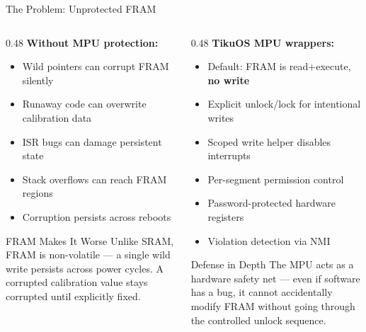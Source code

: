 \documentclass[aspectratio=169, 10pt]{beamer}
\begin{document}
\begin{frame}{The Problem: Unprotected FRAM}
\begin{columns}[T]
\begin{column}{0.48\textwidth}
\textbf{Without MPU protection:}
\begin{itemize}
  \item Wild pointers can corrupt FRAM silently
  \item Runaway code can overwrite calibration data
  \item ISR bugs can damage persistent state
  \item Stack overflows can reach FRAM regions
  \item Corruption persists across reboots
\end{itemize}

\vspace{0.5em}
\begin{alertblock}{FRAM Makes It Worse}
Unlike SRAM, FRAM is non-volatile --- a single wild write
persists across power cycles. A corrupted calibration value
stays corrupted until explicitly fixed.
\end{alertblock}
\end{column}

\begin{column}{0.48\textwidth}
\textbf{TikuOS MPU wrappers:}
\begin{itemize}
  \item Default: FRAM is read+execute, \textbf{no write}
  \item Explicit unlock/lock for intentional writes
  \item Scoped write helper disables interrupts
  \item Per-segment permission control
  \item Password-protected hardware registers
  \item Violation detection via NMI
\end{itemize}

\vspace{0.5em}
\begin{block}{Defense in Depth}
The MPU acts as a hardware safety net --- even if software has
a bug, it cannot accidentally modify FRAM without going through
the controlled unlock sequence.
\end{block}
\end{column}
\end{columns}
\end{frame}

\end{document}
